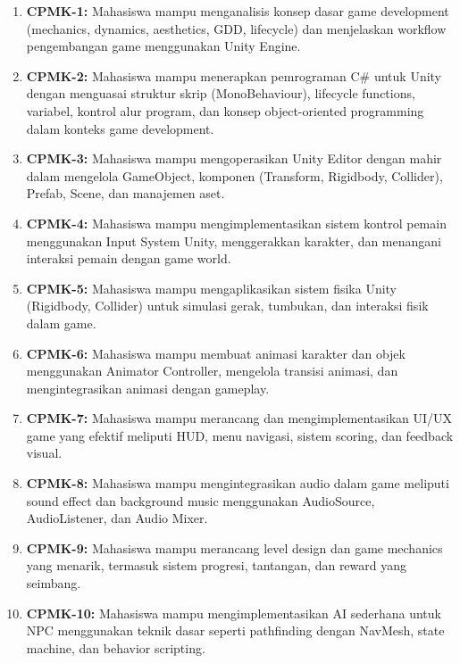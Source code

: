 \begin{enumerate}
  \item \textbf{CPMK-1:} Mahasiswa mampu menganalisis konsep dasar game development (mechanics, dynamics, aesthetics, GDD, lifecycle) dan menjelaskan workflow pengembangan game menggunakan Unity Engine.
  
  \item \textbf{CPMK-2:} Mahasiswa mampu menerapkan pemrograman C\# untuk Unity dengan menguasai struktur skrip (MonoBehaviour), lifecycle functions, variabel, kontrol alur program, dan konsep object-oriented programming dalam konteks game development.
  
  \item \textbf{CPMK-3:} Mahasiswa mampu mengoperasikan Unity Editor dengan mahir dalam mengelola GameObject, komponen (Transform, Rigidbody, Collider), Prefab, Scene, dan manajemen aset.
  
  \item \textbf{CPMK-4:} Mahasiswa mampu mengimplementasikan sistem kontrol pemain menggunakan Input System Unity, menggerakkan karakter, dan menangani interaksi pemain dengan game world.
  
  \item \textbf{CPMK-5:} Mahasiswa mampu mengaplikasikan sistem fisika Unity (Rigidbody, Collider) untuk simulasi gerak, tumbukan, dan interaksi fisik dalam game.
  
  \item \textbf{CPMK-6:} Mahasiswa mampu membuat animasi karakter dan objek menggunakan Animator Controller, mengelola transisi animasi, dan mengintegrasikan animasi dengan gameplay.
  
  \item \textbf{CPMK-7:} Mahasiswa mampu merancang dan mengimplementasikan UI/UX game yang efektif meliputi HUD, menu navigasi, sistem scoring, dan feedback visual.
  
  \item \textbf{CPMK-8:} Mahasiswa mampu mengintegrasikan audio dalam game meliputi sound effect dan background music menggunakan AudioSource, AudioListener, dan Audio Mixer.
  
  \item \textbf{CPMK-9:} Mahasiswa mampu merancang level design dan game mechanics yang menarik, termasuk sistem progresi, tantangan, dan reward yang seimbang.
  
  \item \textbf{CPMK-10:} Mahasiswa mampu mengimplementasikan AI sederhana untuk NPC menggunakan teknik dasar seperti pathfinding dengan NavMesh, state machine, dan behavior scripting.
  

\end{enumerate}
